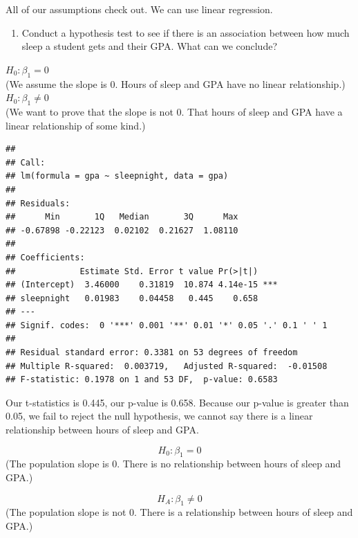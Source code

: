 \documentclass[]{article}
\newenvironment{Shaded}{\begin{snugshade}}{\end{snugshade}}
\newcommand{\KeywordTok}[1]{\textcolor[rgb]{0.13,0.29,0.53}{\textbf{#1}}}
\newcommand{\NormalTok}[1]{#1}
\newcommand{\OperatorTok}[1]{\textcolor[rgb]{0.81,0.36,0.00}{\textbf{#1}}}
\newcommand{\StringTok}[1]{\textcolor[rgb]{0.31,0.60,0.02}{#1}}
\providecommand{\tightlist}{%
  \setlength{\itemsep}{0pt}\setlength{\parskip}{0pt}}
\begin{document}
All of our assumptions check out. We can use linear regression.

\newpage

\begin{enumerate}
\def\labelenumi{\arabic{enumi}.}
\setcounter{enumi}{7}
\tightlist
\item
  Conduct a hypothesis test to see if there is an association between
  how much sleep a student gets and their GPA. What can we conclude?
\end{enumerate}

\(H_0: \beta_1 = 0\)\\
(We assume the slope is 0. Hours of sleep and GPA have no linear
relationship.)\\
\(H_0: \beta_1\ne0\)\\
(We want to prove that the slope is not 0. That hours of sleep and GPA
have a linear relationship of some kind.)

\begin{Shaded}
\end{Shaded}

\begin{verbatim}
## 
## Call:
## lm(formula = gpa ~ sleepnight, data = gpa)
## 
## Residuals:
##      Min       1Q   Median       3Q      Max 
## -0.67898 -0.22123  0.02102  0.21627  1.08110 
## 
## Coefficients:
##             Estimate Std. Error t value Pr(>|t|)    
## (Intercept)  3.46000    0.31819  10.874 4.14e-15 ***
## sleepnight   0.01983    0.04458   0.445    0.658    
## ---
## Signif. codes:  0 '***' 0.001 '**' 0.01 '*' 0.05 '.' 0.1 ' ' 1
## 
## Residual standard error: 0.3381 on 53 degrees of freedom
## Multiple R-squared:  0.003719,   Adjusted R-squared:  -0.01508 
## F-statistic: 0.1978 on 1 and 53 DF,  p-value: 0.6583
\end{verbatim}

Our t-statistics is 0.445, our p-value is 0.658. Because our p-value is
greater than 0.05, we fail to reject the null hypothesis, we cannot say
there is a linear relationship between hours of sleep and GPA.

\[H_0: \beta_1 = 0 \] (The population slope is 0. There is no
relationship between hours of sleep and GPA.)

\[H_A: \beta_1 \ne 0\] (The population slope is not 0. There is a
relationship between hours of sleep and GPA.)
\end{document}
